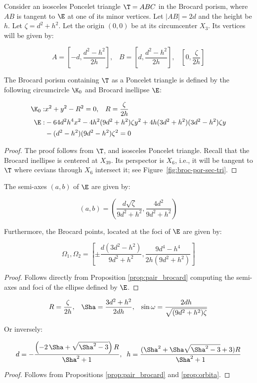 Consider an isosceles Poncelet triangle $\T=ABC$ in the Brocard porism, where $AB$ is tangent to $\E$ at one of its minor vertices. Let $|AB|=2d$ and the height be $h$. Let $\zeta=d^2+h^2$. Let the origin $(0,0)$ be at its circumcenter $X_3$. Its vertices will be given by:

\[A=\left[-d ,\frac{d^2-h^2}{2h}\right], \;\;\; B= \left[d,\frac{d^2-h^2}{2h}\right], \;\;\; \left[0 ,\frac{\zeta}{2h}\right] \]


\begin{proposition}\label{prop:pair_brocard}
The Brocard porism containing $\T$ as a Poncelet triangle is defined by the following circumcircle $\K_0$ and Brocard inellipse $\E$:

\begin{align*}
\K_0:& x^2+y^2-R^2=0, \;\;\; R=\frac{\zeta}{2h}\\
\E:& -64d^2  h^4  x^2-4  h^2  (9  d^2+h^2)  \zeta  y^2 +4  h  (3  d^2+h^2)  (3  d^2-h^2)  \zeta  y\\&-(d^2-h^2) (9d^2 -h^2) \zeta^2=0
\end{align*}
\end{proposition}

\begin{proof}
The proof follows from $\T$, and isosceles Poncelet triangle. Recall that the Brocard inellipse is centered at $X_{39}$. Its perspector is $X_6$, i.e., it will be tangent to $\T$ where cevians through $X_6$ intersect it; see Figure~\ref{fig:broc-por-sec-tri}.
\end{proof}

\begin{proposition}
The semi-axes $(a,b)$ of $\E$ are given by:
 
 \[  (a,b)=\left(\frac{d\sqrt{\zeta}}{9d^2+h^2},\frac{4d^2}{9d^2+h^2}\right)
    \]

Furthermore, the Brocard points, located at the foci of $\E$ are given by:

\[ \Omega_1,\Omega_2=\left[ \pm\frac{d(3d^2- h^2)}{9d^2+h^2}, \frac{9d^4-h^4}{2h(9d^2+h^2)}\right] \]
 \label{prop:orbita}
\end{proposition}   
    
    \begin{proof} Follows directly from Proposition \ref{prop:pair_brocard} computing the semi-axes and foci of the ellipse defined by $\E$.
    \end{proof}

 
\begin{lemma}

\[R= \frac{\zeta}{2h}, \;\;\; \Sha=  \frac{3d^2+h^2}{2dh} ,\;\;\; \sin\omega=\frac{2dh}{\sqrt{(9d^2+h^2)\zeta}}
\]

Or inversely:

\[
d=-{\frac { \left( -2\, \Sha+\sqrt {{ \Sha^2}-3} \right) R}{ \Sha^2
+1}},\;\; h=  \frac{( \Sha^2+\Sha\sqrt{ \Sha^2-3}+3) R}{   \Sha^2+1}
\]
\label{lem:reciprocal}
\end{lemma}
\begin{proof}
Follows from Propositions \ref{prop:pair_brocard} and \ref{prop:orbita}.
\end{proof}
